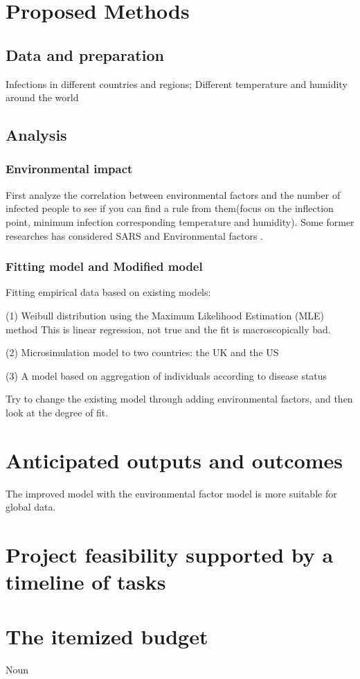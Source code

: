 \documentclass[11pt]{article}
\begin{document}
\section{Proposed Methods}
\subsection{Data and preparation}
Infections in different countries and regions;
Different temperature and humidity around the world
\subsection{ Analysis}
\subsubsection{ Environmental  impact}
First analyze the correlation between environmental factors and the number of infected people to see if you can find a rule from them(focus on the inflection point, minimum infection corresponding temperature and humidity). Some former researches has considered SARS and Environmental factors \citep{R9, R10}.

\subsubsection{ Fitting model and Modified model}
Fitting empirical data based on existing models:

(1) Weibull distribution using the Maximum Likelihood Estimation (MLE) method \citep{R2} 
This is linear regression, not true and the fit is macroscopically bad.

(2) Microsimulation model to two countries: the UK  and the US \citep{R4}

(3) A model based on aggregation of individuals according to disease status \citep{R15}

Try to change the existing model through adding environmental factors, and then look at the degree of fit. 

\section{Anticipated outputs and outcomes}
The improved model with the environmental factor model is more suitable for global data. 

\section{Project feasibility supported by a timeline of tasks}
\begin{figure}[thpb]
	\centering


\end{figure}
\section{The itemized budget}
Noun
\newpage



\end{document}
